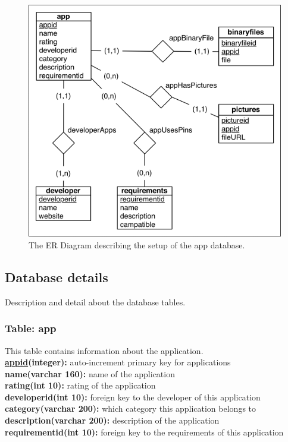 		\begin{figure}[H]
		\includegraphics[scale=1]{images/ER_Diagram.png}
		\caption[ER Diagram]{The ER Diagram describing the setup of the app database.}
		\label{fig:erdiagram}
		\end{figure}

	\subsection{Database details}

		Description and detail about the database tables.

		\subsubsection{Table: app}

			This table contains information about the application.\\

			{\bf \underline{appid}(integer):} auto-increment primary key for applications  \\
			\textbf{name(varchar 160):} name of the application \\
			\textbf{rating(int 10):} rating of the application \\
			\textbf{developerid(int 10):} foreign key to the developer of this application \\
			\textbf{category(varchar 200):} which category this application belongs to \\
			\textbf{description(varchar 200):} description of the application \\
			\textbf{requirementid(int 10):} foreign key to the requirements of this application \\

